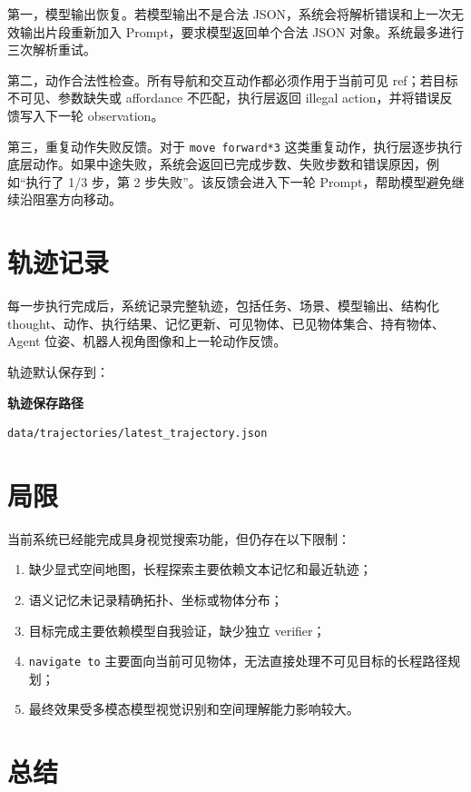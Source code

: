 \documentclass[UTF8,a4paper,12pt]{ctexart}
\begin{document}
第一，模型输出恢复。若模型输出不是合法 JSON，系统会将解析错误和上一次无效输出片段重新加入 Prompt，要求模型返回单个合法 JSON 对象。系统最多进行三次解析重试。

第二，动作合法性检查。所有导航和交互动作都必须作用于当前可见 ref；若目标不可见、参数缺失或 affordance 不匹配，执行层返回 illegal action，并将错误反馈写入下一轮 observation。

第三，重复动作失败反馈。对于 \texttt{move forward*3} 这类重复动作，执行层逐步执行底层动作。如果中途失败，系统会返回已完成步数、失败步数和错误原因，例如“执行了 1/3 步，第 2 步失败”。该反馈会进入下一轮 Prompt，帮助模型避免继续沿阻塞方向移动。

\section{轨迹记录}

每一步执行完成后，系统记录完整轨迹，包括任务、场景、模型输出、结构化 thought、动作、执行结果、记忆更新、可见物体、已见物体集合、持有物体、Agent 位姿、机器人视角图像和上一轮动作反馈。

轨迹默认保存到：

\noindent\textbf{轨迹保存路径}
\begin{lstlisting}
data/trajectories/latest_trajectory.json
\end{lstlisting}



\section{局限}

当前系统已经能完成具身视觉搜索功能，但仍存在以下限制：

\begin{enumerate}
    \item 缺少显式空间地图，长程探索主要依赖文本记忆和最近轨迹；
    \item 语义记忆未记录精确拓扑、坐标或物体分布；
    \item 目标完成主要依赖模型自我验证，缺少独立 verifier；
    \item \texttt{navigate to} 主要面向当前可见物体，无法直接处理不可见目标的长程路径规划；
    \item 最终效果受多模态模型视觉识别和空间理解能力影响较大。
\end{enumerate}



\section{总结}
\end{document}
